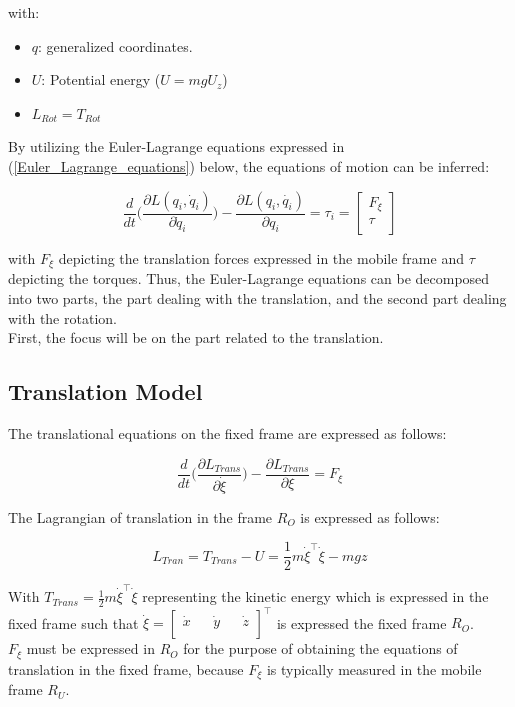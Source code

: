 \documentclass{thesisreport}
\begin{document}
with:

\begin{itemize}
	\item $q$: generalized coordinates.
	\item $U$: Potential energy ($U=mgU_z$)
	\item $L_{Rot} = T_{Rot}$ 
\end{itemize}

By utilizing the Euler-Lagrange equations expressed in (\ref{Euler_Lagrange_equations}) below, the equations of motion can be inferred:


\begin{equation}\label{Euler_Lagrange_equations}
	\frac{d}{dt}\bigg(\frac{\partial L(q_i, \dot{q}_i)}{\partial \dot{q}_i} \bigg) -\frac{\partial L (q_i,\dot{q_i})}{\partial q_i} = \tau_i = \begin{bmatrix}
	F_{\xi}\\
	\tau \\
	\end{bmatrix}
\end{equation}

with $F_{\xi}$ depicting the translation forces expressed in the mobile frame and $\tau$ depicting the torques. Thus, the Euler-Lagrange equations can be decomposed into two parts, the part dealing with the translation, and the second part dealing with the rotation. \\
First, the focus will be on the part related to the translation.

\subsection*{Translation Model}

The translational equations on the fixed frame are expressed as follows:

\begin{equation}\label{E_L_Translation}
\frac{d}{dt}\bigg(\frac{\partial L_{Trans}}{\partial \dot{\xi}}\bigg) - \frac{\partial L_{Trans}}{\partial \xi} = F_{\xi}
\end{equation} 

The Lagrangian of translation in the frame $R_O$ is expressed as follows:

\begin{equation}
	L_{Tran}=T_{Trans}-U = \frac{1}{2}m \dot{\xi}^{\intercal} \dot{\xi} - mgz
\end{equation}

With $T_{Trans}=\frac{1}{2}m \dot{\xi}^{\intercal} \dot{\xi}$ representing the kinetic energy which is expressed in the fixed frame such that $\dot{\xi}=\begin{bmatrix}
\dot{x} && \dot{y} && \dot{z} \\
\end{bmatrix}^{\intercal}$ is expressed the fixed frame $R_O$. \\
$F_{\xi}$ must be expressed in $R_{O}$ for the purpose of obtaining the equations of translation in the fixed frame, because $F_{\xi}$ is typically measured in the mobile frame $R_U$.
\end{document}
